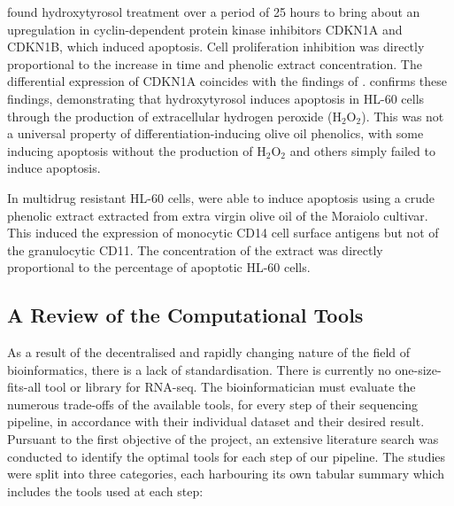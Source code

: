 \cite{fabiani2008inhibition} found hydroxytyrosol treatment over a period of 25 hours to bring about an upregulation in cyclin-dependent protein kinase inhibitors CDKN1A and CDKN1B, which induced apoptosis. Cell proliferation inhibition was directly proportional to the increase in time and phenolic extract concentration. The differential expression of CDKN1A coincides with the findings of \cite{gatt2021tyrosol}. \cite{fabiani2011production} confirms these findings, demonstrating that hydroxytyrosol induces apoptosis in HL-60 cells through the production of extracellular hydrogen peroxide (H$_2$O$_2$). This was not a universal property of differentiation-inducing olive oil phenolics, with some inducing apoptosis without the production of  H$_2$O$_2$ and others simply failed to induce apoptosis.

In multidrug resistant HL-60 cells, \cite{crescimanno2009effects} were able to induce apoptosis using a crude phenolic extract extracted from extra virgin olive oil of the Moraiolo cultivar. This induced the expression of monocytic CD14 cell surface antigens but not of the granulocytic CD11. The concentration of the extract was directly proportional to the percentage of apoptotic HL-60 cells. 





\subsection{A Review of the Computational Tools}
\label{Computational Tools}
As a result of the decentralised and rapidly changing nature of the field of bioinformatics, there is a lack of standardisation. There is currently no one-size-fits-all tool or library for RNA-seq. The bioinformatician must evaluate the numerous trade-offs of the available tools, for every step of their sequencing pipeline, in accordance with their individual dataset and their desired result. Pursuant to the first objective of the project, an extensive literature search was conducted to identify the optimal tools for each step of our pipeline. The studies were split into three categories, each harbouring its own tabular summary which includes the tools used at each step:

